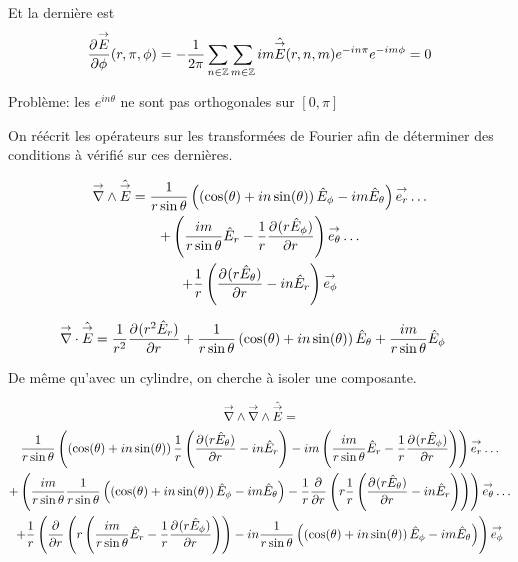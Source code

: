    Et la dernière est 
    \begin{equation}
        \ds\ddr{\phi}{\vE}(r,\pi,\phi) = -\frac{1}{2\pi}\sum_{n\in\ZZ}\sum_{m\in\ZZ} im\hat{\vE}(r,n,m) e^{-in\pi}e^{-im\phi}= 0
    \end{equation}

    \begin{TODO}
        Problème: les \(e^{in\theta}\) ne sont pas orthogonales sur \([0,\pi]\)
    \end{TODO}

    On réécrit les opérateurs sur les transformées de Fourier afin de déterminer des conditions à vérifié sur ces dernières.

    \begin{multline}
        \vrot \hat{\vE} = \frac{1}{r\sin\theta}\left(\left(\cos(\theta) + in\sin(\theta)\right)\hat{E}_\phi - im \hat{E}_\theta\right)\vect{e_r}\dots 
        \\
        + \left(\frac{im}{r\sin\theta}\hat{E}_r - \frac{1}{r}\ddr{r}{(r\hat{E}_\phi)} \right)\vect{e_\theta} \dots
        \\
        + \frac{1}{r}\left(\ddr{r}{(r\hat{E}_\theta)}-in\hat{E}_r\right)\vect{e_\phi}
    \end{multline}

    \begin{align}
        \vdiv \hat{\vE} &= \frac{1}{r^2}\ddr{r}{(r^2\hat{E}_r)}
        + \frac{1}{r\sin\theta}\left(\cos(\theta) + in\sin(\theta)\right)\hat{E}_\theta + \frac{im}{r\sin\theta}{\hat{E}_\phi}
    \end{align}

    De même qu'avec un cylindre, on cherche à isoler une composante.

    \begin{multline}
        \vrot \vrot \hat{\vE} = \\
        \frac{1}{r\sin\theta}\left(\left(\cos(\theta) + in\sin(\theta)\right)\frac{1}{r}\left(\ddr{r}{(r\hat{E}_\theta)}-in\hat{E}_r\right) - im \left(\frac{im}{r\sin\theta}\hat{E}_r - \frac{1}{r}\ddr{r}{(r\hat{E}_\phi)} \right)\right)\vect{e_r}\dots 
        \\
        + \left(\frac{im}{r\sin\theta}\frac{1}{r\sin\theta}\left(\left(\cos(\theta) + in\sin(\theta)\right)\hat{E}_\phi - im \hat{E}_\theta\right) - \frac{1}{r}\ddr{r}{}\left(r \frac{1}{r}\left(\ddr{r}{(r\hat{E}_\theta)}-in\hat{E}_r\right)\right) \right)\vect{e_\theta} \dots
        \\
        + \frac{1}{r}\left(\ddr{r}{}\left(r \left(\frac{im}{r\sin\theta}\hat{E}_r - \frac{1}{r}\ddr{r}{(r\hat{E}_\phi)} \right)\right)-in\frac{1}{r\sin\theta}\left(\left(\cos(\theta) + in\sin(\theta)\right)\hat{E}_\phi - im \hat{E}_\theta\right)\right)\vect{e_\phi}
    \end{multline}

